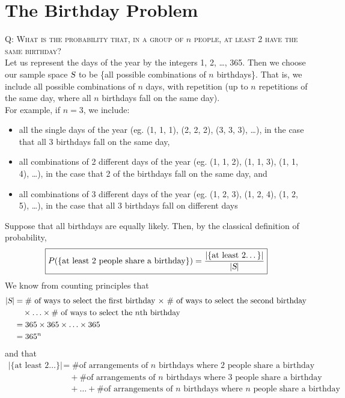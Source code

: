 \documentclass{article}
\begin{document}
\section*{The Birthday Problem}

\textsc{Q: What is the probability that, in a group of $n$ people, at least 2 have the same birthday?}\\[1em]
Let us represent the days of the year by the integers 1, 2, \ldots, 365. Then we choose our sample space $\textsl{S}$ to be \{all possible combinations of $n$ birthdays\}. That is, we include all possible combinations of $n$ days, with repetition (up to $n$ repetitions of the same day, where all $n$ birthdays fall on the same day).\\[1ex]
For example, if $n=3$, we include:
\begin{itemize}
\item all the single days of the year (eg. (1, 1, 1), (2, 2, 2), (3, 3, 3), \ldots), in the case that all 3 birthdays fall on the same day,
\item all combinations of 2 different days of the year (eg. (1, 1, 2), (1, 1, 3), (1, 1, 4), \ldots), in the case that 2 of the birthdays fall on the same day, and
\item all combinations of 3 different days of the year (eg. (1, 2, 3), (1, 2, 4), (1, 2, 5), \ldots), in the case that all 3 birthdays fall on different days
\end{itemize}
Suppose that all birthdays are equally likely. Then, by the classical definition of probability,
\begin{equation*}
\boxed{
P(\{\text{at least 2 people share a birthday}\})=\dfrac{|\{\text{at least 2\ldots}\}|}{|\textsl{S}|}
}
\end{equation*}
We know from counting principles that
\begin{align*}
|\textsl{S}|& =\text{\# of ways to select the first birthday $\times$ \# of ways to select the second birthday}\\
& \quad\times\ldots\times\text{\# of ways to select the $n$th birthday}\\
& =365\times 365\times\ldots\times 365\\
& =365^n
\end{align*}
and that
\begin{align*}
|\{\text{at least 2\ldots}\}|& =\text{\# of arrangements of $n$ birthdays where 2 people share a birthday}\\
& \quad+\text{\# of arrangements of $n$ birthdays where 3 people share a birthday}\\
& \quad+\ldots+\text{\# of arrangements of $n$ birthdays where $n$ people share a birthday}
\end{align*}
\end{document}
